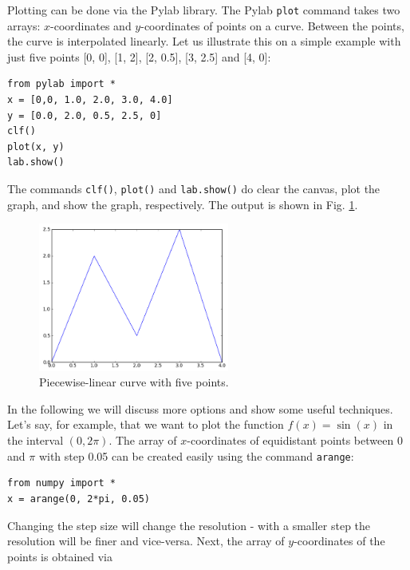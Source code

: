 Plotting can be done via the Pylab library. The Pylab {\tt plot} command takes two
arrays: $x$-coordinates and $y$-coordinates of points on a curve. Between the 
points, the curve is interpolated linearly. Let us illustrate this on a simple 
example with just five points [0, 0], [1, 2], [2, 0.5], [3, 2.5] and [4, 0]:

\begin{verbatim}
from pylab import *
x = [0,0, 1.0, 2.0, 3.0, 4.0]
y = [0.0, 2.0, 0.5, 2.5, 0]
clf()
plot(x, y)
lab.show()
\end{verbatim}
The commands {\tt clf()}, {\tt plot()} and {\tt lab.show()} do clear the canvas, 
plot the graph, and show the graph, respectively.
The output is shown in Fig. \ref{fig:plot}.


\begin{figure}[!ht]
\begin{center}
\hbox{}
\hspace{-6mm}
\includegraphics[width=0.56\textwidth]{imgp/plot.png}
\end{center}
\vspace{-2mm}
\caption{Piecewise-linear curve with five points.}
\label{fig:plot}
\end{figure}
\noindent
In the following we will discuss more options and show some useful techniques.
Let's say, for example, that we want to plot the function $f(x) = \sin(x)$
in the interval $(0, 2\pi)$. The array of $x$-coordinates of equidistant points 
between 0 and $\pi$ with step 0.05 can be created easily using the command {\tt arange}:

\begin{verbatim}
from numpy import *
x = arange(0, 2*pi, 0.05)
\end{verbatim}
Changing the step size will change the resolution - with a smaller step the resolution will 
be finer and vice-versa. Next, the array of $y$-coordinates of the points is obtained via

